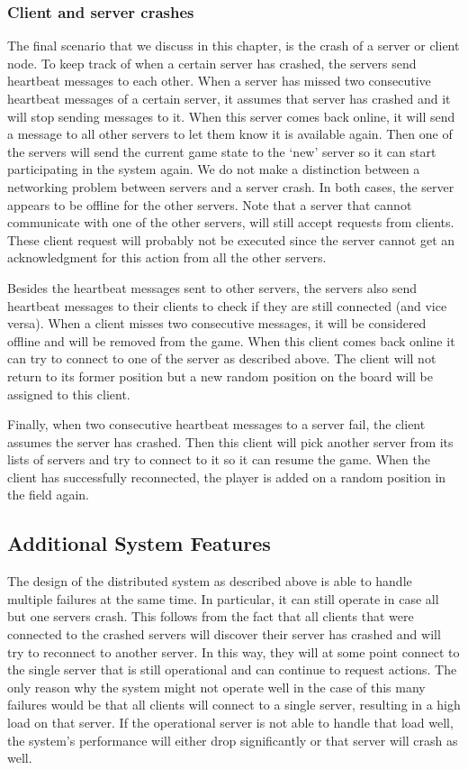 \subsubsection{Client and server crashes}
\label{subsubsec:client_server_crashes}
The final scenario that we discuss in this chapter, is the crash of a server or client node. 
To keep track of when a certain server has crashed, the servers send heartbeat messages to each other. 
When a server has missed two consecutive heartbeat messages of a certain server, it assumes that server has crashed and it will stop sending messages to it.
When this server comes back online, it will send a message to all other servers to let them know it is available again. 
Then one of the servers will send the current game state to the `new' server so it can start participating in the system again.
We do not make a distinction between a networking problem between servers and a server crash. 
In both cases, the server appears to be offline for the other servers. 
Note that a server that cannot communicate with one of the other servers, will still accept requests from clients. These client request will probably not be executed since the server cannot get an acknowledgment for this action from all the other servers.

Besides the heartbeat messages sent to other servers, the servers also send heartbeat messages to their clients to check if they are still connected (and vice versa). 
When a client misses two consecutive messages, it will be considered offline and will be removed from the game.
When this client comes back online it can try to connect to one of the server as described above. The client will not return to its former position but a new random position on the board will be assigned to this client.

Finally, when two consecutive heartbeat messages to a server fail, the client assumes the server has crashed. 
Then this client will pick another server from its lists of servers and try to connect to it so it can resume the game. 
When the client has successfully reconnected, the player is added on a random position in the field again.

\subsection{Additional System Features}
\label{subsec:additional_features}
The design of the distributed system as described above is able to handle multiple failures at the same time. 
In particular, it can still operate in case all but one servers crash. 
This follows from the fact that all clients that were connected to the crashed servers will discover their server has crashed and will try to reconnect to another server.
In this way, they will at some point connect to the single server that is still operational and can continue to request actions.
The only reason why the system might not operate well in the case of this many failures would be that all clients will connect to a single server, resulting in a high load on that server.
If the operational server is not able to handle that load well, the system's performance will either drop significantly or that server will crash as well.

 
